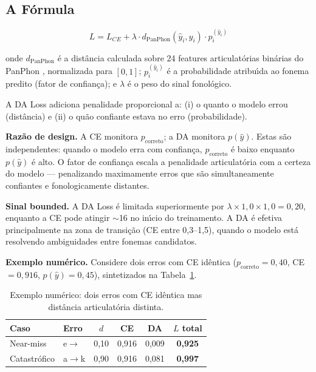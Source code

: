\documentclass[12pt]{article}
\newcommand{\ipaE}{\textipa{E}}%
\begin{document}
\subsection{A F\'ormula}

\begin{equation}
L = L_{CE} + \lambda \cdot d_{\text{PanPhon}}(\hat{y}_i, y_i)
    \cdot p_i^{(\hat{y}_i)}
\end{equation}

\noindent onde $d_{\text{PanPhon}}$ \'e a dist\^ancia calculada sobre 24
features articulat\'orias bin\'arias do PanPhon
\cite{mortensen2016panphon}, normalizada para $[0,1]$;
$p_i^{(\hat{y}_i)}$ \'e a probabilidade atribu\'{\i}da ao fonema predito
(fator de confian\c{c}a); e $\lambda$ \'e o peso do sinal fonol\'ogico.

A DA Loss adiciona penalidade proporcional a: (i) o quanto o modelo errou
(dist\^ancia) e (ii) o qu\~ao confiante estava no erro (probabilidade).

\textbf{Raz\~ao de design.} A CE monitora $p_\text{correto}$; a DA
monitora $p(\hat{y})$. Estas s\~ao independentes: quando o modelo erra
com confian\c{c}a, $p_\text{correto}$ \'e baixo enquanto $p(\hat{y})$
\'e alto. O fator de confian\c{c}a escala a penalidade articulat\'oria
com a certeza do modelo --- penalizando maximamente erros que s\~ao
simultaneamente confiantes e fonologicamente distantes.

\textbf{Sinal bounded.} A DA Loss \'e limitada superiormente por
$\lambda \times 1{,}0 \times 1{,}0 = 0{,}20$, enquanto a CE pode
atingir ${\sim}$16 no in\'{\i}cio do treinamento. A DA \'e efetiva
principalmente na zona de transi\c{c}\~ao (CE entre 0,3--1,5), quando
o modelo est\'a resolvendo ambiguidades entre fonemas candidatos.

\textbf{Exemplo num\'erico.} Considere dois erros com CE id\^entica
($p_\text{correto}{=}0{,}40$, CE${=}0{,}916$, $p(\hat{y}){=}0{,}45$),
sintetizados na Tabela~\ref{tab:example}.

\begin{table}[ht]
\centering
\caption{Exemplo num\'erico: dois erros com CE id\^entica mas
         dist\^ancia articulat\'oria distinta.}
\label{tab:example}
\begin{tabular}{llcccc}
\toprule
\textbf{Caso} & \textbf{Erro} & $d$ & \textbf{CE} & \textbf{DA} & $L$ total \\
\midrule
Near-miss      & e$\to$\ipaE{} & 0,10 & 0,916 & 0,009 & \textbf{0,925} \\
Catastr\'ofico & a$\to$k       & 0,90 & 0,916 & 0,081 & \textbf{0,997} \\
\bottomrule
\end{tabular}
\end{table}
\end{document}
